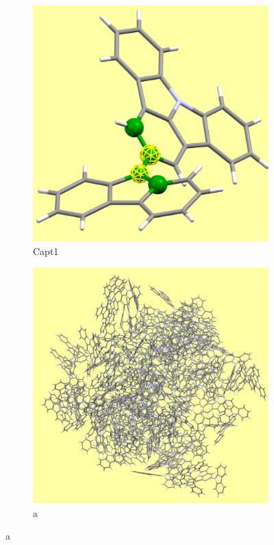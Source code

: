 		\begin{figure}[htbp]
			\centering
			\begin{subfigure}[t]{0.5\textwidth}
				\includegraphics[width=1\textwidth]{./Figures/single_K4.png}
				\caption{Capt1}
			\end{subfigure}%
			\begin{subfigure}[t]{0.5\textwidth}
				\includegraphics[width=1\textwidth]{./Figures/ensemble_K4.png}
				\caption{a}
			\end{subfigure}
			

\end{figure}

